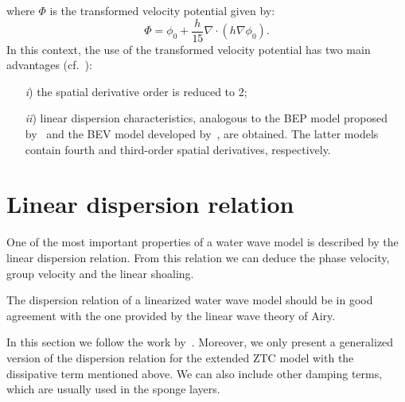 where $\Phi$ is the transformed velocity potential given by:
\begin{equation}\label{eq:lopes:phitrans}
\Phi=\phi_0+\frac{h}{15}\nabla\cdot(h\nabla\phi_0) .
\end{equation}
 In this context, the use of the transformed velocity
 potential has two main advantages
 (cf.~\cite{ZhaoTengCheng2004}):
\begin{itemize}
\item[{\it i})] the spatial derivative order is reduced to 2;
\item[{\it ii})] linear dispersion characteristics,
  analogous to the  BEP model proposed
  by~\cite{ChenLiu1994} and the  BEV model
  developed by~\cite{Nwogu1993}, are obtained.
The latter models contain fourth and third-order spatial
derivatives, respectively.
\end{itemize}

\section{Linear dispersion relation}\label{sec:lopes:dispersionproperties}
One of the most important properties of a water wave model
is described by the linear dispersion relation.  From this
relation we can deduce the phase velocity, group velocity
and the linear shoaling.

The dispersion relation  of a
linearized water wave model should be in good agreement with
the one provided by the linear wave theory of Airy.


In this section we follow the work by~\cite{DutykhDias2007}.
Moreover, we only present a generalized version of the
dispersion relation for the extended ZTC model with the
dissipative term mentioned above.  We can also include other
damping terms, which are usually used in the sponge layers.


